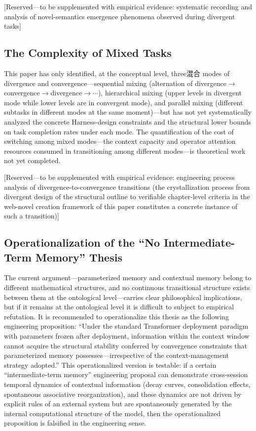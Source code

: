 \documentclass[11pt,a4paper]{article}
\theoremstyle{definition}
\begin{document}
{[}Reserved---to be supplemented with empirical evidence: systematic recording and analysis of novel-semantics emergence phenomena observed during divergent tasks{]}

\subsection{The Complexity of Mixed Tasks}

This paper has only identified, at the conceptual level, three混合 modes of divergence and convergence---sequential mixing (alternation of divergence$\to$convergence$\to$divergence$\to\cdots$), hierarchical mixing (upper levels in divergent mode while lower levels are in convergent mode), and parallel mixing (different subtasks in different modes at the same moment)---but has not yet systematically analyzed the concrete Harness-design constraints and the structural lower bounds on task completion rates under each mode. The quantification of the cost of switching among mixed modes---the context capacity and operator attention resources consumed in transitioning among different modes---is theoretical work not yet completed.

{[}Reserved---to be supplemented with empirical evidence: engineering process analysis of divergence-to-convergence transitions (the crystallization process from divergent design of the structural outline to verifiable chapter-level criteria in the web-novel creation framework of this paper constitutes a concrete instance of such a transition){]}

\subsection{Operationalization of the ``No Intermediate-Term Memory'' Thesis}

The current argument---parameterized memory and contextual memory belong to different mathematical structures, and no continuous transitional structure exists between them at the ontological level---carries clear philosophical implications, but if it remains at the ontological level it is difficult to subject to empirical refutation. It is recommended to operationalize this thesis as the following engineering proposition: ``Under the standard Transformer deployment paradigm with parameters frozen after deployment, information within the context window cannot acquire the structural stability conferred by convergence constraints that parameterized memory possesses---irrespective of the context-management strategy adopted.'' This operationalized version is testable: if a certain ``intermediate-term memory'' engineering proposal can demonstrate cross-session temporal dynamics of contextual information (decay curves, consolidation effects, spontaneous associative reorganization), and these dynamics are not driven by explicit rules of an external system but are spontaneously generated by the internal computational structure of the model, then the operationalized proposition is falsified in the engineering sense.
\end{document}
